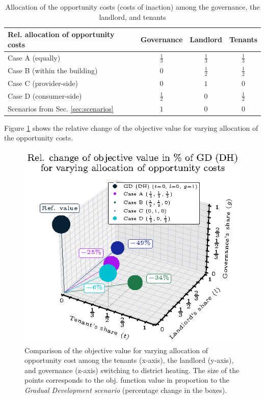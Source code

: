\begin{table}[h]
	\centering
		\renewcommand{\arraystretch}{1.35}
		\begin{tabular}{lccc}
			\toprule
			Rel. allocation of opportunity costs& Governance & Landlord & Tenants\\
			\hline
			Case A (equally) & $\frac{1}{3}$ & $\frac{1}{3}$ & $\frac{1}{3}$\\
			Case B (within the building) & 0 & $\frac{1}{2}$ & $\frac{1}{2}$\\
			Case C (provider-side) & 0 & $1$ & 0\\
			Case D (consumer-side) & $\frac{1}{2}$ & 0 & $\frac{1}{2}$\\
			\hline
			\cellcolor{Gray}Scenarios from Sec. \ref{sec:scenarios} & \cellcolor{Gray}$1$ & \cellcolor{Gray}0 & \cellcolor{Gray}0\\
			\bottomrule
	\end{tabular}
	\caption{Allocation of the opportunity costs (costs of inaction) among the governance, the landlord, and tenants}
	\label{tab:allocation}
\end{table}

Figure \ref{fig:3dplot} shows the relative change of the objective value for varying allocation of the opportunity costs. 

\begin{figure}[h]
	\centering
	\includegraphics[width=0.7\linewidth]{figures/4_Results/fig_3d_plot/3d.eps}
	\caption{Comparison of the objective value for varying allocation of opportunity cost among the tenants (x-axis), the landlord (y-axis), and governance (z-axis) switching to district heating. The size of the points corresponds to the obj. function value in proportion to the \textit{Gradual Development scenario} (percentage change in the boxes).}
	\label{fig:3dplot}
\end{figure}

